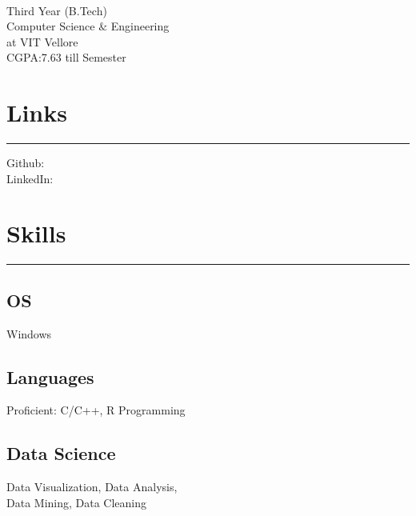 \documentclass[]{meetresume-class}
\begin{document}
	
	
	\begin{minipage}[t]{0.33\textwidth} 
		\begin{large}
			\\
		\end{large}
		Third Year (B.Tech)\\
		Computer Science $\&$ Engineering\\ 
		at VIT Vellore \\ 
		CGPA:7.63 till  Semester 
		
		
		\section{Links} 
		\noindent\rule{5cm}{0.6pt}
		
		Github: \href{https://github.com/MeetDarkPow}{} \\
		LinkedIn:  \href{https://www.linkedin.com/in/meet-bhatnagar-a41842181/}{}
		\sectionsep
		\section{Skills}
		\noindent\rule{5cm}{0.6pt}
	
		\subsection{OS}
		Windows
		\vspace{6pt}
		
		\subsection{Languages}
		Proficient: C/C++, R Programming
		\vspace{6pt}
		
		\subsection{Data Science}
		Data Visualization, Data Analysis,\\
		Data Mining, Data Cleaning
		\vspace{6pt}
		

\end{minipage}
\end{document}
